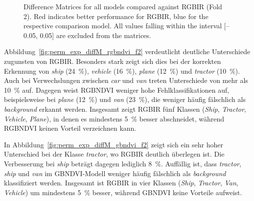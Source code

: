 \begin{figure}[htbp]
    \caption[Difference Matrices compared to RGBIR (Fold 2)]{Difference Matrices for all models compared against RGBIR (Fold 2). Red indicates better performance for RGBIR, blue for the respective comparison model. All values falling within the interval [–0.05, 0.05] are excluded from the matrices.}
    \label{fig:perm_exp_diffM_all}
\end{figure}

%     

Abbildung~\ref{fig:perm_exp_diffM_rgbndvi_f2} verdeutlicht deutliche Unterschiede zugunsten von RGBIR. Besonders stark zeigt sich dies bei der korrekten Erkennung von \textit{ship} (24~\%), \textit{vehicle} (16~\%), \textit{plane} (12~\%) und \textit{tractor} (10~\%). Auch bei Verwechslungen zwischen \textit{car} und \textit{van} treten Unterschiede von mehr als 10~\% auf. Dagegen weist RGBNDVI weniger hohe Fehlklassifikationen auf, beispielsweise bei \textit{plane} (12~\%) und \textit{van} (23~\%), die weniger häufig fälschlich als \textit{background} erkannt werden. Insgesamt zeigt RGBIR fünf Klassen (\textit{Ship}, \textit{Tractor}, \textit{Vehicle}, \textit{Plane}), in denen es mindestens 5~\% besser abschneidet, während RGBNDVI keinen Vorteil verzeichnen kann.

%     

In Abbildung~\ref{fig:perm_exp_diffM_gbndvi_f2} zeigt sich ein sehr hoher Unterschied bei der Klasse \textit{tractor}, wo RGBIR deutlich überlegen ist. Die Verbesserung bei \textit{ship} beträgt dagegen lediglich 8~\%. Auffällig ist, dass \textit{tractor}, \textit{ship} und \textit{van} im GBNDVI-Modell weniger häufig fälschlich als \textit{background} klassifiziert werden. Insgesamt ist RGBIR in vier Klassen (\textit{Ship}, \textit{Tractor}, \textit{Van}, \textit{Vehicle}) um mindestens 5~\% besser, während GBNDVI keine Vorteile aufweist.

